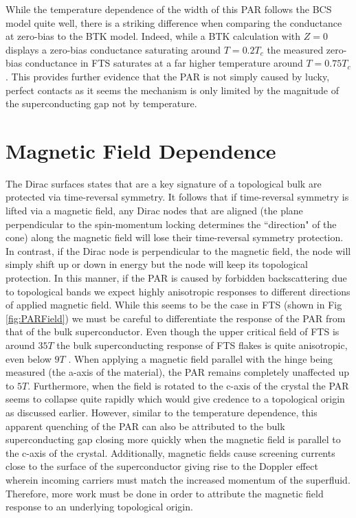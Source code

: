While the temperature dependence of the width of this \ac{PAR} follows the \ac{BCS} model quite well, there is a striking difference when comparing the conductance at zero-bias to the \ac{BTK} model. Indeed, while a \ac{BTK} calculation with $Z=0$ displays a zero-bias conductance saturating around $T=0.2T_{c}$ the measured zero-bias conductance in \ac{FTS} saturates at a far higher temperature around $T = 0.75T_{c}$. This provides further evidence that the \ac{PAR} is not simply caused by lucky, perfect contacts as it seems the mechanism is only limited by the magnitude of the superconducting gap not by temperature.  

\section{Magnetic Field Dependence}
The Dirac surfaces states that are a key signature of a topological bulk are protected via time-reversal symmetry. It follows that if time-reversal symmetry is lifted via a magnetic field, any Dirac nodes that are aligned (the plane perpendicular to the spin-momentum locking determines the ``direction" of the cone) along the magnetic field will lose their time-reversal symmetry protection. In contrast, if the Dirac node is perpendicular to the magnetic field, the node will simply shift up or down in energy but the node will keep its topological protection. In this manner, if the \ac{PAR} is caused by forbidden backscattering due to topological bands we expect highly anisotropic responses to different directions of applied magnetic field. While this seems to be the case in \ac{FTS} (shown in Fig \ref{fig:PARField}) we must be careful to differentiate the response of the \ac{PAR} from that of the bulk superconductor. Even though the upper critical field of \ac{FTS} is around $35 T$\cite{Mele2012} the bulk superconducting response of \ac{FTS} flakes is quite anisotropic, even below $9 T$ \cite{zalic2019}. When applying a magnetic field parallel with the hinge being measured (the a-axis of the material), the \ac{PAR} remains completely unaffected up to $5 T$. Furthermore, when the field is rotated to the c-axis of the crystal the \ac{PAR} seems to collapse quite rapidly which would give credence to a topological origin as discussed earlier. However, similar to the temperature dependence, this apparent quenching of the \ac{PAR} can also be attributed to the bulk superconducting gap closing more quickly when the magnetic field is parallel to the c-axis of the crystal\cite{zalic2019}. Additionally, magnetic fields cause screening currents close to the surface of the superconductor giving rise to the Doppler effect wherein incoming carriers must match the increased momentum of the superfluid\cite{Zareapour2012}. Therefore, more work must be done in order to attribute the magnetic field response to an underlying topological origin.
